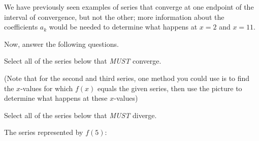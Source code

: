 \documentclass{ximera}
\begin{document}
\begin{exercise}
\begin{exercise}
We have previously seen examples of series that converge at one endpoint of the interval of convergence, but not the other; more information about the coefficients $a_k$ would be needed to determine what happens at $x=2$ and $x=11$.



Now, answer the following questions.

\begin{exercise}
Select all of the series below that \emph{MUST} converge.
\begin{selectAll}
\end{selectAll}
(Note that for the second and third series, one method you could use
is to find the $x$-values for which $f(x)$ equals the given series,
then use the picture to determine what happens at these $x$-values)
\end{exercise}

\begin{exercise}
Select all of the series below that \emph{MUST} diverge.
\begin{selectAll}
\end{selectAll}
\end{exercise}

\begin{exercise}
The series represented by $f(5)$:

\begin{multipleChoice}
\end{multipleChoice}
\end{exercise}

\end{exercise}
\end{exercise}
\end{document}
